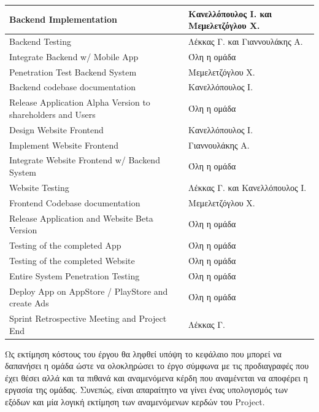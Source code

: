\documentclass{../ol-softwaremanual}
\begin{document}
\begin{longtable}{| p{} | p{} |}
		\hline
		\en Backend Implementation \gr       &  Κανελλόπουλος Ι. και Μεμελετζόγλου Χ.         \\
		\hline
		\en Backend Testing \gr       & Λέκκας Γ. και Γιαννουλάκης Α.       \\
		\hline
		\en Integrate Backend w/ Mobile App \gr       &  Όλη η ομάδα         \\
		\hline
		\en Penetration Test Backend System \gr       &  Μεμελετζόγλου Χ.        \\
		\hline
		\en Backend codebase documentation \gr       &  Κανελλόπουλος Ι.        \\
		\hline
		\en Release Application Alpha Version to shareholders and Users \gr       &  Όλη η ομάδα        \\
		\hline
		\en Design Website Frontend \gr       &  Κανελλόπουλος Ι.        \\
		\hline
		\en Implement Website Frontend \gr       &  Γιαννουλάκης Α.        \\
		\hline
		\en Integrate Website Frontend w/ Backend System \gr       &  Όλη η ομάδα        \\
		\hline
		\en Website Testing \gr       &  Λέκκας Γ. και Κανελλόπουλος Ι.       \\
		\hline
		\en Frontend Codebase documentation \gr       &  Μεμελετζόγλου Χ.       \\
		\hline
		\en Release Application and Website Beta Version \gr       &  Όλη η ομάδα        \\
		\hline
		\en Testing of the completed App \gr       &  Όλη η ομάδα        \\
		\hline
		\en Testing of the completed Website \gr       &   Όλη η ομάδα        \\
		\hline
		\en Entire System Penetration Testing \gr       &   Όλη η ομάδα        \\
		\hline
		\en Deploy App on AppStore / PlayStore and create Ads \gr       &   Όλη η ομάδα       \\
		\hline
		\en Sprint Retrospective Meeting and Project End \gr       &  Λέκκας Γ.        \\
		\hline
	\end{longtable}
	
	\vspace{30pt}
	
	
	
	\vspace{20pt}
	
	\flushleft
	Ως εκτίμηση κόστους του έργου θα ληφθεί υπόψη το κεφάλαιο που μπορεί να δαπανήσει η ομάδα ώστε να ολοκληρώσει το έργο σύμφωνα με τις προδιαγραφές που έχει θέσει αλλά και τα πιθανά και αναμενόμενα κέρδη που αναμένεται να αποφέρει η εργασία της ομάδας. Συνεπώς, είναι απαραίτητο να γίνει ένας υπολογισμός των εξόδων και μία λογική εκτίμηση των αναμενόμενων κερδών του \en Project.\gr \\
	
\end{document}
